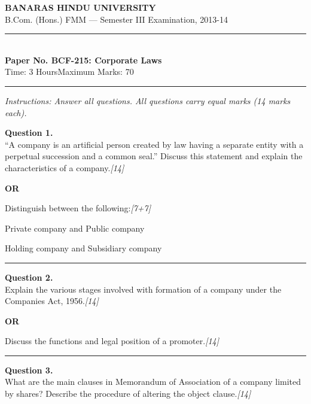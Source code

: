 \documentclass[11pt,a4paper]{article}
\newcommand{\pts}[1]{\hfill   \textit{[#1]}}
\begin{document}
\begin{center}
  {\large\bfseries BANARAS HINDU UNIVERSITY}\\[2pt]
  {\normalsize B.Com. (Hons.) FMM --- Semester III Examination, 2013-14}\\[6pt]
  \rule{0.8\linewidth}{0.5pt}\\[6pt]
  {\large\bfseries Paper No. BCF-215: Corporate Laws}\\[4pt]
  {\normalsize Time: 3 Hours\hfill Maximum Marks: 70}
\end{center}

\rule{\linewidth}{0.4pt}

\smallskip



\noindent   \textit{Instructions: Answer all questions. All questions carry equal marks (14 marks each).}

\bigskip




\noindent   \textbf{Question 1.} \\
``A company is an artificial person created by law having a separate entity with a perpetual succession and a common seal.'' Discuss this statement and explain the characteristics of a company.\pts{14}

\centerline{   \textbf{OR}}

Distinguish between the following:\pts{7+7}

\begin{parts}
  \item Private company and Public company
  \item Holding company and Subsidiary company
\end{parts}

\medskip\rule{\linewidth}{0.2pt}




\noindent   \textbf{Question 2.} \\
Explain the various stages involved with formation of a company under the Companies Act, 1956.\pts{14}

\centerline{   \textbf{OR}}

Discuss the functions and legal position of a promoter.\pts{14}

\medskip\rule{\linewidth}{0.2pt}




\noindent   \textbf{Question 3.} \\
What are the main clauses in Memorandum of Association of a company limited by shares? Describe the procedure of altering the object clause.\pts{14}
\end{document}
